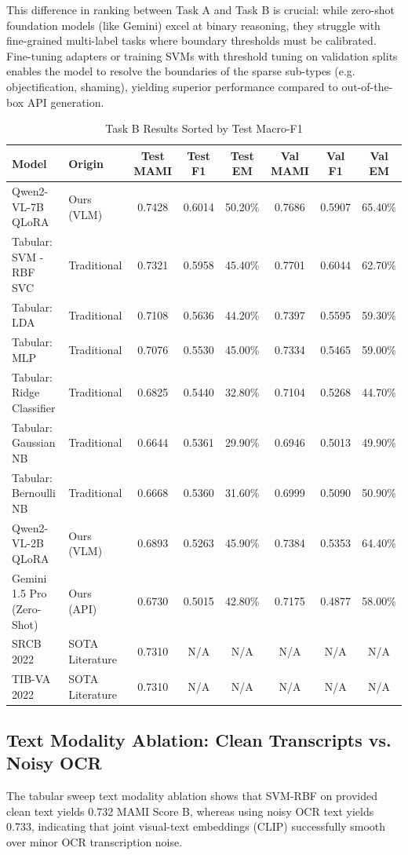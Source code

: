 \documentclass[11pt]{article}
\begin{document}
This difference in ranking between Task A and Task B is crucial: while zero-shot foundation models (like Gemini) excel at binary reasoning, they struggle with fine-grained multi-label tasks where boundary thresholds must be calibrated. Fine-tuning adapters or training SVMs with threshold tuning on validation splits enables the model to resolve the boundaries of the sparse sub-types (e.g. objectification, shaming), yielding superior performance compared to out-of-the-box API generation.

\begin{table}[h]
\centering
\footnotesize
\caption{Task B Results Sorted by Test Macro-F1}
\label{tab:task_b_results}
\begin{tabular}{llcccccc}
\toprule
\textbf{Model} & \textbf{Origin} & \textbf{Test MAMI} & \textbf{Test F1} & \textbf{Test EM} & \textbf{Val MAMI} & \textbf{Val F1} & \textbf{Val EM} \\
\midrule
Qwen2-VL-7B QLoRA & Ours (VLM) & 0.7428 & 0.6014 & 50.20\% & 0.7686 & 0.5907 & 65.40\% \\
Tabular: SVM - RBF SVC & Traditional & 0.7321 & 0.5958 & 45.40\% & 0.7701 & 0.6044 & 62.70\% \\
Tabular: LDA & Traditional & 0.7108 & 0.5636 & 44.20\% & 0.7397 & 0.5595 & 59.30\% \\
Tabular: MLP & Traditional & 0.7076 & 0.5530 & 45.00\% & 0.7334 & 0.5465 & 59.00\% \\
Tabular: Ridge Classifier & Traditional & 0.6825 & 0.5440 & 32.80\% & 0.7104 & 0.5268 & 44.70\% \\
Tabular: Gaussian NB & Traditional & 0.6644 & 0.5361 & 29.90\% & 0.6946 & 0.5013 & 49.90\% \\
Tabular: Bernoulli NB & Traditional & 0.6668 & 0.5360 & 31.60\% & 0.6999 & 0.5090 & 50.90\% \\
Qwen2-VL-2B QLoRA & Ours (VLM) & 0.6893 & 0.5263 & 45.90\% & 0.7384 & 0.5353 & 64.40\% \\
Gemini 1.5 Pro (Zero-Shot) & Ours (API) & 0.6730 & 0.5015 & 42.80\% & 0.7175 & 0.4877 & 58.00\% \\
\midrule
SRCB 2022 \cite{zhang2022srcb} & SOTA Literature & 0.7310 & N/A & N/A & N/A & N/A & N/A \\
TIB-VA 2022 \cite{hakimov2022tibva} & SOTA Literature & 0.7310 & N/A & N/A & N/A & N/A & N/A \\
\bottomrule
\end{tabular}
\end{table}

\subsection{Text Modality Ablation: Clean Transcripts vs. Noisy OCR}
The tabular sweep text modality ablation shows that SVM-RBF on provided clean text yields 0.732 MAMI Score B, whereas using noisy OCR text yields 0.733, indicating that joint visual-text embeddings (CLIP) successfully smooth over minor OCR transcription noise.
\end{document}
